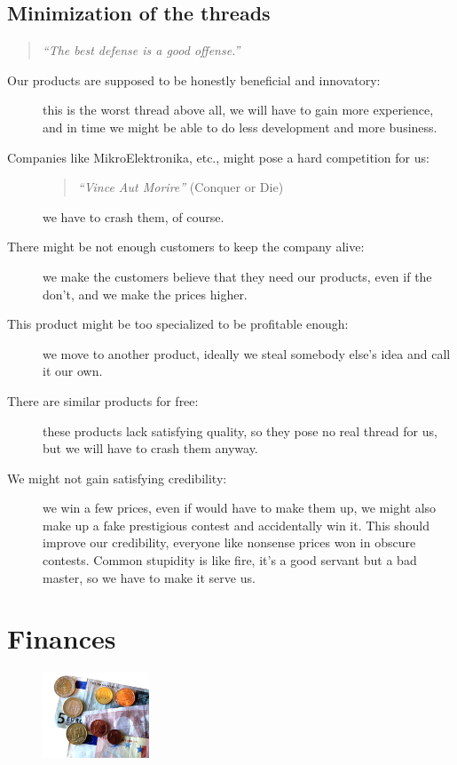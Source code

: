 \documentclass[a4paper,twoside,15pt]{book}
\begin{document}
		\subsection{Minimization of the threads}
			\begin{quote}
				\textit{``The best defense is a good offense.''}
			\end{quote}
			 \begin{description}
				\item[Our products are supposed to be honestly beneficial and innovatory:]
					this is the worst thread above all, we will have to gain more experience, and in time we might be able to do less development and more business.
				\item[Companies like MikroElektronika, etc., might pose a hard competition for us:]
					\begin{quote}
						\textit{``Vince Aut Morire''} \small{(Conquer or Die)}
					\end{quote}
					we have to crash them, of course.
				\item[There might be not enough customers to keep the company alive:]
					we make the customers believe that they need our products, even if the don't, and we make the prices higher.
				\item[This product might be too specialized to be profitable enough:]
					we move to another product, ideally we steal somebody else's idea and call it our own.
				\item[There are similar products for free:]
					these products lack satisfying quality, so they pose no real thread for us, but we will have to crash them anyway.
				\item[We might not gain satisfying credibility:]
					we win a few prices, even if would have to make them up, we might also make up a fake prestigious contest and accidentally win it. This should improve our credibility, everyone like nonsense prices won in obscure contests. Common stupidity is like fire, it's a good servant but a bad master, so we have to make it serve us.
			 \end{description}

	\section{Finances}
		\begin{figure}
			\centering{}
			\includegraphics[width=90pt]{images/Euromoenterogsedler.jpg}
		\end{figure}
\end{document}
